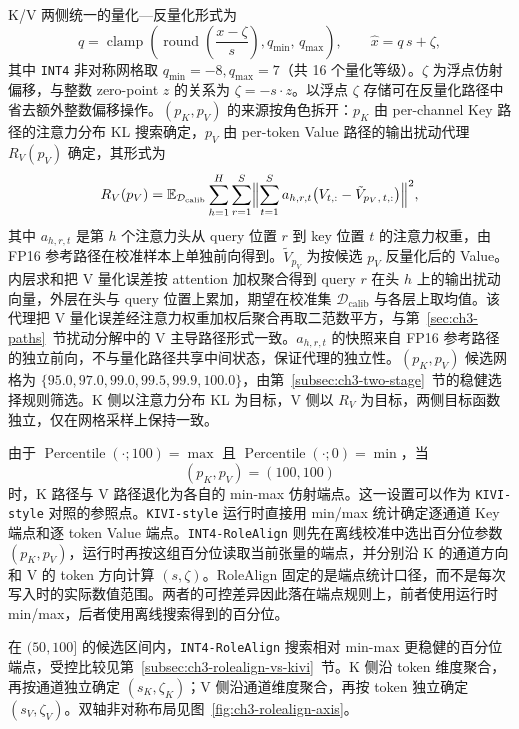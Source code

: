 K/V 两侧统一的量化—反量化形式为
\begin{equation}
q
=
\operatorname{clamp}\!\left(
\operatorname{round}\!\left(\frac{x-\zeta}{s}\right),
q_{\min},\,q_{\max}
\right),
\qquad
\hat x = q\,s+\zeta,
\end{equation}
其中 \texttt{INT4} 非对称网格取 $q_{\min}=-8, q_{\max}=7$（共 16 个量化等级）。$\zeta$ 为浮点仿射偏移，与整数 zero-point $z$ 的关系为 $\zeta = -s\cdot z$。以浮点 $\zeta$ 存储可在反量化路径中省去额外整数偏移操作。$(p_K, p_V)$ 的来源按角色拆开：$p_K$ 由 per-channel Key 路径的注意力分布 KL 搜索确定，$p_V$ 由 per-token Value 路径的输出扰动代理 $R_V(p_V)$ 确定，其形式为
\begin{equation}
R_V(p_V) = \mathbb{E}_{\mathcal D_{\mathrm{calib}}}\sum_{h=1}^{H}\sum_{r=1}^{S}\Bigl\|\sum_{t=1}^{S} a_{h,r,t}\bigl(V_{t,:} - \tilde V_{p_V,\,t,:}\bigr)\Bigr\|^2,
\end{equation}
其中 $a_{h,r,t}$ 是第 $h$ 个注意力头从 query 位置 $r$ 到 key 位置 $t$ 的注意力权重，由 FP16 参考路径在校准样本上单独前向得到。$\tilde V_{p_V}$ 为按候选 $p_V$ 反量化后的 Value。内层求和把 V 量化误差按 attention 加权聚合得到 query $r$ 在头 $h$ 上的输出扰动向量，外层在头与 query 位置上累加，期望在校准集 $\mathcal D_{\mathrm{calib}}$ 与各层上取均值。该代理把 V 量化误差经注意力权重加权后聚合再取二范数平方，与第~\ref{sec:ch3-paths}~节扰动分解中的 V 主导路径形式一致。$a_{h,r,t}$ 的快照来自 FP16 参考路径的独立前向，不与量化路径共享中间状态，保证代理的独立性。$(p_K, p_V)$ 候选网格为 $\{95.0, 97.0, 99.0, 99.5, 99.9, 100.0\}$，由第~\ref{subsec:ch3-two-stage}~节的稳健选择规则筛选。K 侧以注意力分布 KL 为目标，V 侧以 $R_V$ 为目标，两侧目标函数独立，仅在网格采样上保持一致。

由于 $\operatorname{Percentile}(\cdot; 100)=\max$ 且 $\operatorname{Percentile}(\cdot; 0)=\min$，当
\begin{equation}
(p_K, p_V) = (100, 100)
\end{equation}
时，K 路径与 V 路径退化为各自的 min-max 仿射端点。这一设置可以作为 \texttt{KIVI-style} 对照的参照点。\texttt{KIVI-style} 运行时直接用 min/max 统计确定逐通道 Key 端点和逐 token Value 端点。\texttt{INT4-RoleAlign} 则先在离线校准中选出百分位参数 $(p_K,p_V)$，运行时再按这组百分位读取当前张量的端点，并分别沿 K 的通道方向和 V 的 token 方向计算 $(s,\zeta)$。RoleAlign 固定的是端点统计口径，而不是每次写入时的实际数值范围。两者的可控差异因此落在端点规则上，前者使用运行时 min/max，后者使用离线搜索得到的百分位。

在 $(50,100]$ 的候选区间内，\texttt{INT4-RoleAlign} 搜索相对 min-max 更稳健的百分位端点，受控比较见第~\ref{subsec:ch3-rolealign-vs-kivi}~节。K 侧沿 token 维度聚合，再按通道独立确定 $(s_K,\zeta_K)$；V 侧沿通道维度聚合，再按 token 独立确定 $(s_V,\zeta_V)$。双轴非对称布局见图~\ref{fig:ch3-rolealign-axis}。


